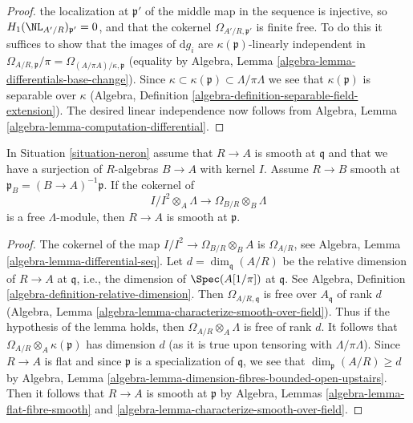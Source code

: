 \begin{proof}
the localization at $\mathfrak p'$ of the middle map in the sequence is
injective, so $H_1(\NL_{A'/R})_{\mathfrak p'} = 0$, and
that the cokernel $\Omega_{A'/R, \mathfrak p'}$ is finite free.
To do this it suffices to show
that the images of $\text{d}g_i$ are $\kappa(\mathfrak p)$-linearly
independent in
$\Omega_{A/R, \mathfrak p}/\pi = \Omega_{(A/\pi A)/\kappa, \mathfrak p}$
(equality by Algebra, Lemma \ref{algebra-lemma-differentials-base-change}).
Since $\kappa \subset \kappa(\mathfrak p) \subset \Lambda/\pi \Lambda$
we see that $\kappa(\mathfrak p)$ is separable over $\kappa$
(Algebra, Definition \ref{algebra-definition-separable-field-extension}).
The desired linear independence now follows from
Algebra, Lemma \ref{algebra-lemma-computation-differential}.
\end{proof}

\begin{lemma}
\label{lemma-neron-when-smooth}
In Situation \ref{situation-neron} assume that $R \to A$ is smooth
at $\mathfrak q$ and that we have a surjection of $R$-algebras
$B \to A$ with kernel $I$. Assume $R \to B$ smooth at
$\mathfrak p_B = (B \to A)^{-1}\mathfrak p$. If the cokernel of
$$
I/I^2 \otimes_A \Lambda \to \Omega_{B/R} \otimes_B \Lambda
$$
is a free $\Lambda$-module, then $R \to A$ is smooth at $\mathfrak p$.
\end{lemma}

\begin{proof}
The cokernel of the map $I/I^2 \to \Omega_{B/R} \otimes_B A$
is $\Omega_{A/R}$, see Algebra, Lemma \ref{algebra-lemma-differential-seq}.
Let $d = \dim_\mathfrak q(A/R)$ be the relative dimension of $R \to A$
at $\mathfrak q$, i.e., the dimension of $\Spec(A[1/\pi])$ at $\mathfrak q$.
See Algebra, Definition \ref{algebra-definition-relative-dimension}.
Then $\Omega_{A/R, \mathfrak q}$ is free over $A_\mathfrak q$ of rank $d$
(Algebra, Lemma \ref{algebra-lemma-characterize-smooth-over-field}).
Thus if the hypothesis of the lemma holds,
then $\Omega_{A/R} \otimes_A \Lambda$ is free of rank $d$.
It follows that $\Omega_{A/R} \otimes_A \kappa(\mathfrak p)$
has dimension $d$ (as it is true upon tensoring with $\Lambda/\pi \Lambda$).
Since $R \to A$ is flat and since $\mathfrak p$
is a specialization of $\mathfrak q$, we see that
$\dim_\mathfrak p(A/R) \geq d$ by Algebra, Lemma
\ref{algebra-lemma-dimension-fibres-bounded-open-upstairs}.
Then it follows that $R \to A$ is smooth at $\mathfrak p$ by
Algebra, Lemmas \ref{algebra-lemma-flat-fibre-smooth} and
\ref{algebra-lemma-characterize-smooth-over-field}.
\end{proof}

